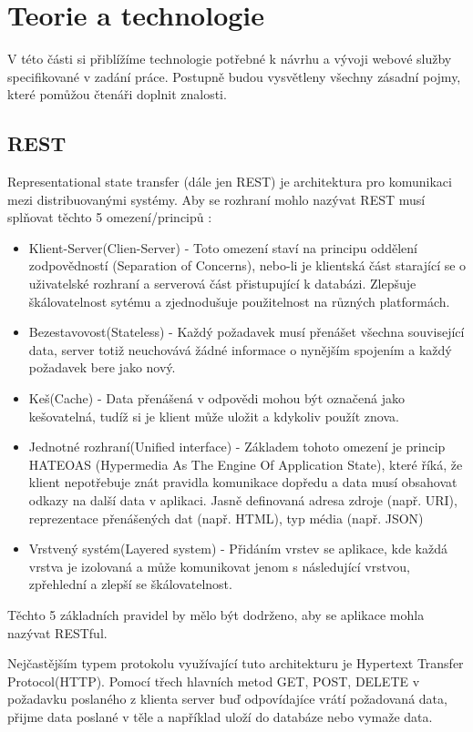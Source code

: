    
  \chapter{Teorie a technologie}
  V této části si přiblížíme technologie potřebné k návrhu a vývoji webové služby specifikované v zadání práce. Postupně budou vysvětleny všechny zásadní pojmy, které pomůžou čtenáři doplnit znalosti.
  
  
  \section{REST}
	Representational state transfer (dále jen REST) je architektura pro komunikaci \cite{rest} mezi distribuovanými systémy. Aby se rozhraní mohlo nazývat REST musí splňovat těchto 5 omezení/principů \cite{restThesis}: 
	\begin{itemize}
		\item Klient-Server(Clien-Server) - Toto omezení staví na principu oddělení zodpovědností (Separation of Concerns), nebo-li je klientská část starající se o uživatelské rozhraní a serverová část přistupující k databázi. Zlepšuje škálovatelnost sytému a zjednodušuje použitelnost na různých platformách.
		\item Bezestavovost(Stateless) - Každý požadavek musí přenášet všechna související data, server totiž neuchovává žádné informace o nynějším spojením a každý požadavek bere jako nový.
		\item Keš(Cache) - Data přenášená v odpovědi mohou být označená jako kešovatelná, tudíž si je klient může uložit a kdykoliv použít znova.
		\item Jednotné rozhraní(Unified interface) - Základem tohoto omezení je princip HATEOAS (Hypermedia As The Engine Of Application State), které říká, že klient nepotřebuje znát pravidla komunikace dopředu a data musí obsahovat odkazy na další data v aplikaci. Jasně definovaná adresa zdroje (např. URI), reprezentace přenášených dat (např. HTML), typ média (např. JSON)
		\item Vrstvený systém(Layered system) - Přidáním vrstev se aplikace, kde každá vrstva je izolovaná a může komunikovat jenom s následující vrstvou, zpřehlední a zlepší se škálovatelnost.
	\end{itemize}
	Těchto 5 základních pravidel by mělo být dodrženo, aby se aplikace mohla nazývat RESTful.  
	
	Nejčastějším typem protokolu využívající tuto architekturu je Hypertext Transfer Protocol(HTTP). Pomocí třech hlavních metod GET, POST, DELETE v požadavku poslaného z klienta server buď odpovídajíce vrátí požadovaná data, přijme data poslané v těle a například uloží do databáze nebo vymaže data. 
  
